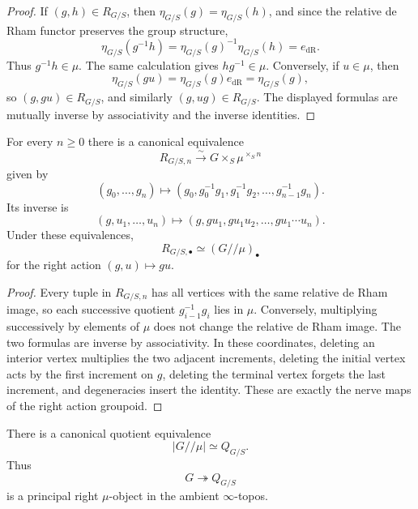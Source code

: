 \begin{proof}
If $(g,h)\in R_{G/S}$, then
$\eta_{G/S}(g)=\eta_{G/S}(h)$, and since the relative de Rham functor preserves
the group structure,
\[
    \eta_{G/S}(g^{-1}h)
    =
    \eta_{G/S}(g)^{-1}\eta_{G/S}(h)
    =
    e_{\mathrm{dR}}.
\]
Thus $g^{-1}h\in\mu$.  The same calculation gives
$hg^{-1}\in\mu$.  Conversely, if $u\in\mu$, then
\[
    \eta_{G/S}(gu)
    =
    \eta_{G/S}(g)e_{\mathrm{dR}}
    =
    \eta_{G/S}(g),
\]
so $(g,gu)\in R_{G/S}$, and similarly $(g,ug)\in R_{G/S}$.  The displayed
formulas are mutually inverse by associativity and the inverse identities.
\end{proof}

\begin{theorem}
\label{thm:higher-translation-coordinates}
For every $n\geq0$ there is a canonical equivalence
\[
    R_{G/S,n}
    \xrightarrow{\sim}
    G\times_S\mu^{\times_S n}
\]
given by
\[
    (g_0,\ldots,g_n)
    \longmapsto
    \left(
        g_0,
        g_0^{-1}g_1,
        g_1^{-1}g_2,
        \ldots,
        g_{n-1}^{-1}g_n
    \right).
\]
Its inverse is
\[
    (g,u_1,\ldots,u_n)
    \longmapsto
    \left(
        g,
        gu_1,
        gu_1u_2,
        \ldots,
        gu_1\cdots u_n
    \right).
\]
Under these equivalences,
\[
    R_{G/S,\bullet}
    \simeq
    (G/\!/\mu)_\bullet
\]
for the right action $(g,u)\mapsto gu$.
\end{theorem}

\begin{proof}
Every tuple in $R_{G/S,n}$ has all vertices with the same relative de Rham
image, so each successive quotient
$g_{i-1}^{-1}g_i$ lies in $\mu$.  Conversely, multiplying successively by
elements of $\mu$ does not change the relative de Rham image.  The two formulas
are inverse by associativity.  In these coordinates, deleting an interior
vertex multiplies the two adjacent increments, deleting the initial vertex
acts by the first increment on $g$, deleting the terminal vertex forgets the
last increment, and degeneracies insert the identity.  These are exactly the
nerve maps of the right action groupoid.
\end{proof}

\begin{corollary}
\label{cor:principal-formal-identity-torsor}
There is a canonical quotient equivalence
\[
    \left|G/\!/\mu\right|
    \simeq
    Q_{G/S}.
\]
Thus
\[
    G\twoheadrightarrow Q_{G/S}
\]
is a principal right $\mu$-object in the ambient $\infty$-topos.
\end{corollary}

